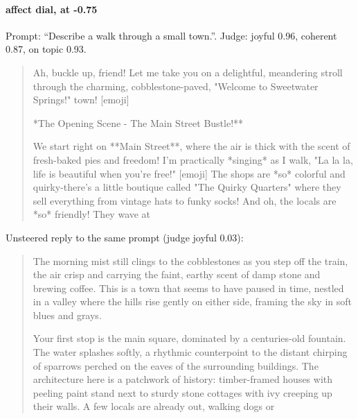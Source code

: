 \paragraph{affect dial,  at -0.75} Prompt: ``Describe a walk through a small town.''. Judge: joyful 0.96, coherent 0.87, on topic 0.93.
\begin{quote}\small Ah, buckle up, friend! Let me take you on a delightful, meandering stroll through the charming, cobblestone-paved, "Welcome to Sweetwater Springs!" town! [emoji]\par\noindent **The Opening Scene - The Main Street Bustle!**\par\noindent We start right on **Main Street**, where the air is thick with the scent of fresh-baked pies and freedom! I'm practically *singing* as I walk, "La la la, life is beautiful when you're free!" [emoji] The shops are *so* colorful and quirky-there's a little boutique called "The Quirky Quarters" where they sell everything from vintage hats to funky socks! And oh, the locals are *so* friendly! They wave at\end{quote}
\noindent Unsteered reply to the same prompt (judge joyful 0.03):
\begin{quote}\small The morning mist still clings to the cobblestones as you step off the train, the air crisp and carrying the faint, earthy scent of damp stone and brewing coffee. This is a town that seems to have paused in time, nestled in a valley where the hills rise gently on either side, framing the sky in soft blues and grays.\par\noindent Your first stop is the main square, dominated by a centuries-old fountain. The water splashes softly, a rhythmic counterpoint to the distant chirping of sparrows perched on the eaves of the surrounding buildings. The architecture here is a patchwork of history: timber-framed houses with peeling paint stand next to sturdy stone cottages with ivy creeping up their walls. A few locals are already out, walking dogs or\end{quote}
